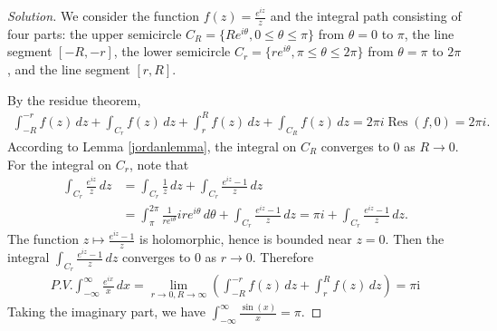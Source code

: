 \documentclass{article}
\numberwithin{equation}{section}
\DeclareMathOperator{\res}{Res}
\renewcommand{\i}{\mathrm{i}}
\theoremstyle{plain}
\theoremstyle{definition}
\begin{document}
\begin{proof}[Solution]
We consider the function $f(z)=\frac{e^{i z}}{z}$ and the integral path consisting of four parts: the upper semicircle $C_R=\{Re^{i\theta},0\leq\theta\leq\pi\}$ from $\theta=0$ to $\pi$, the line segment $[-R,-r]$, the lower semicircle $C_r=\{re^{i\theta},\pi\leq\theta\leq 2\pi\}$ from $\theta=\pi$ to $2\pi$, and the line segment $[r,R]$.
\begin{center}
\end{center}
By the residue theorem,
\begin{align*}
	\int_{-R}^{-r}f(z)\,dz+\int_{C_r}f(z)\,dz+\int_r^Rf(z)\,dz+\int_{C_R}f(z)\,dz=2\pi i\res\left(f,0\right)=2\pi i.
\end{align*}
According to Lemma \ref{jordanlemma}, the integral on $C_R$ converges to $0$ as $R\to 0$. For the integral on $C_r$, note that
\begin{align*}
\int_{C_r}\frac{e^{iz}}{z}\,dz&=\int_{C_r}\frac{1}{z}\,dz+\int_{C_r}\frac{e^{iz}-1}{z}\,dz\\
&=\int_\pi^{2\pi}\frac{1}{re^{i\theta}}ire^{i\theta}\,d\theta+\int_{C_r}\frac{e^{iz}-1}{z}\,dz=\pi i+\int_{C_r}\frac{e^{iz}-1}{z}\,dz.
\end{align*}
The function $z\mapsto\frac{e^{iz}-1}{z}$ is holomorphic, hence is bounded near $z=0$. Then the integral $\int_{C_r}\frac{e^{iz}-1}{z}\,dz$ converges to $0$ as $r\to 0$. Therefore
\begin{align*}
	P.V.\int_{-\infty}^{\infty}\frac{e^{ix}}{x}\,dx=\lim_{r\to 0,R\to\infty}\left(\int_{-R}^{-r}f(z)\,dz+\int_r^Rf(z)\,dz\right)=\pi\i
\end{align*}
Taking the imaginary part, we have $\int_{-\infty}^\infty\frac{\sin(x)}{x}=\pi$.
\end{proof}
\end{document}
